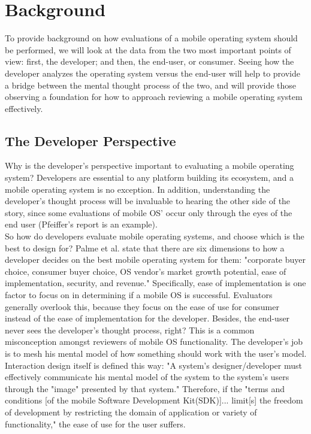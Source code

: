 \documentclass[11pt]{article}
\begin{document}
\section{Background}
\label{background}
To provide background on how evaluations of a mobile operating system should be performed, we will look at the data from the two most important points of view: first, the developer; and then, the end-user, or consumer. Seeing how the developer analyzes the operating system versus the end-user will help to provide a bridge between the mental thought process of the two, and will provide those observing a foundation for how to approach reviewing a mobile operating system effectively.
\subsection{The Developer Perspective}
Why is the developer's perspective important to evaluating a mobile operating system? Developers are essential to any platform building its ecosystem, and a mobile operating system is no exception. In addition, understanding the developer's thought process will be invaluable to hearing the other side of the story, since some evaluations of mobile OS' occur only through the eyes of the end user (Pfeiffer's report is an example). \\
\indent So how do developers evaluate mobile operating systems, and choose which is the best to design for? Palme et al. state that there are six dimensions to how a developer decides on the best mobile operating system for them: "corporate buyer choice, consumer buyer choice, OS vendor's market growth potential, ease of implementation, security, and revenue." \cite{Palme} Specifically, ease of implementation is one factor to focus on in determining if a mobile OS is successful. Evaluators generally overlook this, because they focus on the ease of use for consumer instead of the ease of implementation for the developer. Besides, the end-user never sees the developer's thought process, right? This is a common misconception amongst reviewers of mobile OS functionality. The developer's job is to mesh his mental model of how something should work with the user's model. Interaction design itself is defined this way: "A system's designer/developer must effectively communicate his mental model of the system to the system's users through the "image" presented by that system." Therefore, if the "terms and 
conditions [of the mobile Software Development Kit(SDK)]... limit[s] the freedom of development by restricting the domain of application or variety of functionality," the ease of use for the user suffers. \cite{Palme} %
\end{document}
